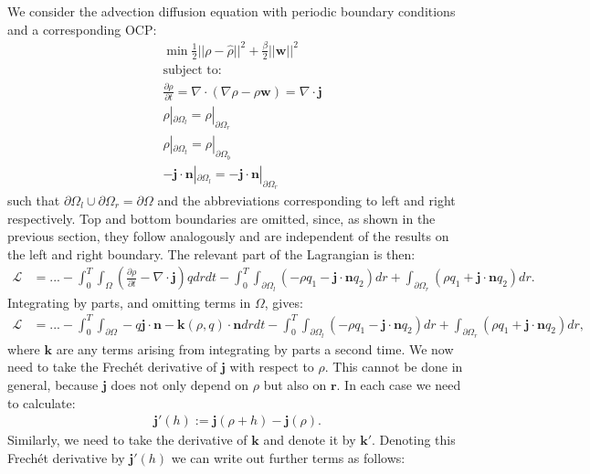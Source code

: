 \documentclass[11pt, a4paper]{article}
\theoremstyle{definition}
\newcommand{\w}{\mathbf{w}}
\newcommand{\n}{\mathbf{n}}
\newcommand{\hr}{\widehat \rho}
\newcommand{\jf}{\mathbf j}
\begin{document}
We consider the advection diffusion equation with periodic boundary conditions and a corresponding OCP:
\begin{align*}
	&\min \frac{1}{2}|| \rho - \hr||^2 + \frac{\beta}{2}||\w||^2\\
	&\text{subject to:}\\
	&\frac{\partial \rho}{\partial t} = \nabla \cdot \left(\nabla \rho - \rho \w\right) = \nabla \cdot \jf\\
	& \rho|_{\partial \Omega_l} = \rho|_{\partial \Omega_r}\\
	& \rho|_{\partial \Omega_t} = \rho|_{\partial \Omega_b}\\
	& - \jf \cdot \n |_{\partial \Omega_l}= - \jf \cdot \n|_{\partial \Omega_r}
\end{align*}
such that $\partial\Omega_l \cup \partial\Omega_r = \partial \Omega$ and the abbreviations corresponding to left and right respectively. Top and bottom boundaries are omitted, since, as shown in the previous section, they follow analogously and are independent of the results on the left and right boundary.
The relevant part of the Lagrangian is then:
\begin{align*}
	\mathcal{L} &= ... -\int_0^T \int_\Omega \left(\frac{\partial \rho}{\partial t} - \nabla \cdot \jf\right)q dr dt - \int_0^T \int_{\partial \Omega_l} \left(- \rho q_1 - \jf \cdot \n q_2 \right) dr  + \int_{\partial \Omega_r} \left(\rho q_1 +  \jf \cdot \n q_2  \right)  dr .
\end{align*}
Integrating by parts, and omitting terms in $\Omega$, gives:
\begin{align*}
	\mathcal{L} &= ... - \int_0^T \int_{\partial \Omega}- q \jf  \cdot \n - \mathbf{k}(\rho, q) \cdot \n  dr dt - \int_0^T \int_{\partial \Omega_l} \left(- \rho q_1 - \jf \cdot \n q_2 \right)   dr  + \int_{\partial \Omega_r} \left(\rho q_1 + \jf \cdot \n q_2 \right)   dr, 
\end{align*}
where $\mathbf{k}$ are any terms arising from integrating by parts a second time.
We now need to take the Frech\'et derivative of $\jf$ with respect to $\rho$. This cannot be done in general, because $\jf$ does not only depend on $\rho$ but also on $\mathbf r$. In each case we need to calculate:
\begin{align*}
	\jf'(h) := \jf (\rho + h) - \jf (\rho).
\end{align*}
Similarly, we need to take the derivative of $\mathbf k$ and denote it by $\mathbf{k}'$.
Denoting this Frech\'et derivative by $\jf'(h)$ we can write out further terms as follows:
\end{document}

